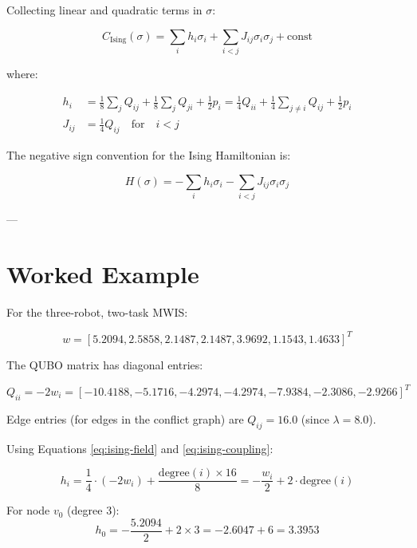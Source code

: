 Collecting linear and quadratic terms in $\sigma$:

\begin{equation}\label{eq:ising-cost}
C_{\text{Ising}}(\sigma) = \sum_i h_i \sigma_i + \sum_{i < j} J_{ij} \sigma_i \sigma_j + \text{const}
\end{equation}

where:

\begin{align}
h_i &= \frac{1}{8} \sum_j Q_{ij} + \frac{1}{8} \sum_j Q_{ji} + \frac{1}{2} p_i = \frac{1}{4} Q_{ii} + \frac{1}{4} \sum_{j \neq i} Q_{ij} + \frac{1}{2} p_i \label{eq:ising-field} \\
J_{ij} &= \frac{1}{4} Q_{ij} \quad \text{for} \quad i < j \label{eq:ising-coupling}
\end{align}

The negative sign convention for the Ising Hamiltonian is:

\begin{equation}
H(\sigma) = -\sum_i h_i \sigma_i - \sum_{i < j} J_{ij} \sigma_i \sigma_j
\end{equation}

---

\section{Worked Example}

For the three-robot, two-task MWIS:

\begin{equation}
w = [5.2094, 2.5858, 2.1487, 2.1487, 3.9692, 1.1543, 1.4633]^T
\end{equation}

The QUBO matrix has diagonal entries:

\begin{equation}
Q_{ii} = -2w_i = [-10.4188, -5.1716, -4.2974, -4.2974, -7.9384, -2.3086, -2.9266]^T
\end{equation}

Edge entries (for edges in the conflict graph) are $Q_{ij} = 16.0$ (since $\lambda = 8.0$).

Using Equations \eqref{eq:ising-field} and \eqref{eq:ising-coupling}:

\begin{equation}
h_i = \frac{1}{4} \cdot (-2w_i) + \frac{\text{degree}(i) \times 16}{8} = -\frac{w_i}{2} + 2 \cdot \text{degree}(i)
\end{equation}

For node $v_0$ (degree 3):
\begin{equation}
h_0 = -\frac{5.2094}{2} + 2 \times 3 = -2.6047 + 6 = 3.3953
\end{equation}


